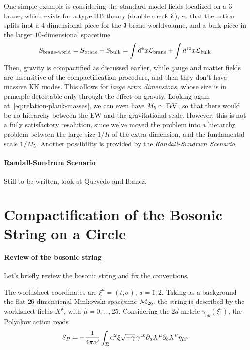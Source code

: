 One simple example is considering the standard model fields localized on a $3$-brane, which exists for a type IIB theory (double check it), so that the action splits inot a $4$ dimensional piece for the $3$-brane worldvolume, and a bulk piece in the larger $10$-dimensional spacetime
\begin{equation}
    S_\textup{brane-world} = S_\textup{brane} + S_\textup{bulk} = \int {\mathop{}\!\mathrm{d}}^4 x \mathcal{L}_\textup{brane} + \int d^{10} x \mathcal{L}_\textup{bulk} .
\end{equation}
Then, gravity is compactified as discussed earlier, while gauge and matter fields are insensitive of the compactification procedure, and then they don't have massive KK modes. This allows for \emph{large extra dimensions}, whose size is in principle detectable only through the effect on gravity. Looking again at~\eqref{eq:relation-plank-masses}, we can even have $M_5 \simeq \textup{TeV}$, so that there would be no hierarchy between the EW and the gravitational scale. However, this is not a fully satisfactory resolution, since we've moved the problem into a hierarchy problem between the large size $1/R$ of the extra dimension, and the fundamental scale $1/M_5$. Another possibility is provided by the \emph{Randall-Sundrum Scenario}

\paragraph{Randall-Sundrum Scenario}
Still to be written, look at Quevedo and Ibanez.


\section{Compactification of the Bosonic String on a Circle}
\paragraph{Review of the bosonic string} Let's briefly review the bosonic string and fix the conventions. 

The worldsheet coordinates are $\xi^a = (t, \sigma)$, $a= 1,2$. Taking as a background the flat $26$-dimensional Minkowski spacetime $\mathcal{M}_{26}$, the string is described by the worldsheet fields $X^{\hat{\mu}}$, with $\hat{\mu} = 0, \dots, 25$. Considering the $2d$ metric $\gamma_{ab}(\xi^a)$, the Polyakov action reads
\begin{equation}
    S_P= -\frac{1}{4\pi\alpha'} \int_\Sigma \mathop{}\!\mathrm{d}^2 \xi \sqrt{-\gamma} \, \gamma^{ab} \partial_a X^{\hat{\mu}} \partial_b X^{\hat{\nu}} \eta_{\hat{\mu}\hat{\nu}} .
\end{equation}

